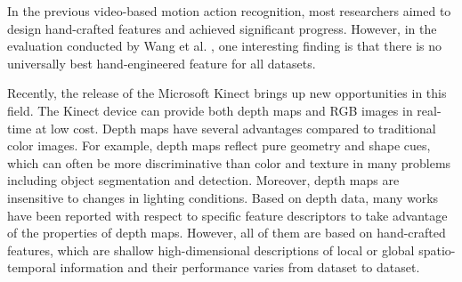 \documentclass[conference]{IEEEtran}
\begin{document}
In the previous video-based motion action recognition, most researchers aimed to design hand-crafted features and achieved significant progress. However, in the evaluation conducted by Wang et al. \cite{wang2009evaluation}, one interesting finding is that there is no universally best hand-engineered feature for all datasets.


Recently, the release of the Microsoft Kinect brings up new opportunities in this field. The Kinect device can provide both depth maps and RGB images in real-time at low cost. Depth maps have several advantages compared to traditional color images. For example, depth maps reflect pure geometry and shape cues, which can often be more discriminative than color and texture in many problems including object segmentation and detection. Moreover, depth maps are insensitive to changes in lighting conditions. Based on depth data, many works \cite{Li2010, wang2012mining, Oreifej2013, yangsuper} have been reported with respect to specific feature descriptors to take advantage of the properties of depth maps. However, all of them are based on hand-crafted features, which are shallow high-dimensional descriptions of local or global spatio-temporal information and their performance varies from dataset to dataset.
\end{document}
